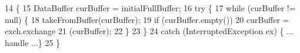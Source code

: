 \begin{DoxyCode}
14                    \{
15  DataBuffer curBuffer = initialFullBuffer;
16  \textcolor{keywordflow}{try} \{
17  \textcolor{keywordflow}{while} (curBuffer != null) \{
18  takeFromBuffer(curBuffer);
19  \textcolor{keywordflow}{if} (curBuffer.empty())
20  curBuffer = exch.exchange
21 (curBuffer);
22  \}
23  \}
24  \textcolor{keywordflow}{catch} (InterruptedException ex) \{ ... handle ...\}
25  \}
\end{DoxyCode}

